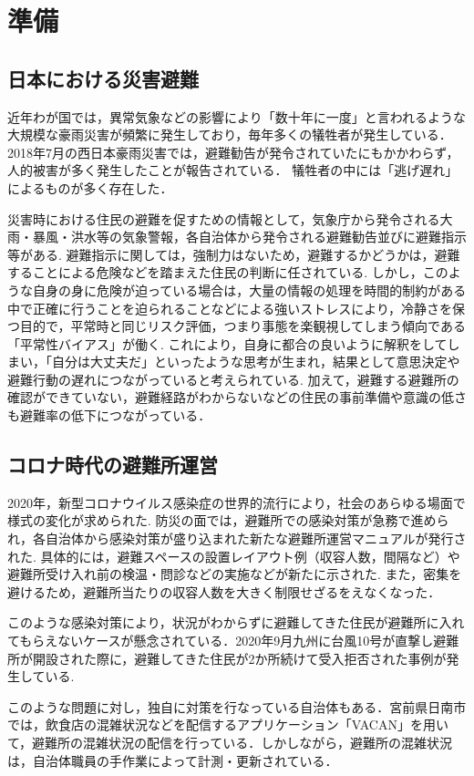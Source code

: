 \documentclass[technicalreport,dvipdfmx]{ieicej}
\begin{document}
\section{準備}
\subsection{日本における災害避難} 
近年わが国では，異常気象などの影響により「数十年に一度」と言われるような大規模な豪雨災害が頻繁に発生しており，毎年多くの犠牲者が発生している． 2018年7月の西日本豪雨災害では，避難勧告が発令されていたにもかかわらず，人的被害が多く発生したことが報告されている．\cite{1} 犠牲者の中には「逃げ遅れ」によるものが多く存在した．

災害時における住民の避難を促すための情報として，気象庁から発令される大雨・暴風・洪水等の気象警報，各自治体から発令される避難勧告並びに避難指示等がある. 避難指示に関しては，強制力はないため，避難するかどうかは，避難することによる危険などを踏まえた住民の判断に任されている. しかし，このような自身の身に危険が迫っている場合は，大量の情報の処理を時間的制約がある中で正確に行うことを迫られることなどによる強いストレスにより，冷静さを保つ目的で，平常時と同じリスク評価，つまり事態を楽観視してしまう傾向である「平常性バイアス」が働く. これにより，自身に都合の良いように解釈をしてしまい，「自分は大丈夫だ」といったような思考が生まれ，結果として意思決定や避難行動の遅れにつながっていると考えられている. \cite{2} 加えて，避難する避難所の確認ができていない，避難経路がわからないなどの住民の事前準備や意識の低さも避難率の低下につながっている．

\subsection{コロナ時代の避難所運営}
2020年，新型コロナウイルス感染症の世界的流行により，社会のあらゆる場面で様式の変化が求められた. 防災の面では，避難所での感染対策が急務で進められ，各自治体から感染対策が盛り込まれた新たな避難所運営マニュアルが発行された. 具体的には，避難スペースの設置レイアウト例（収容人数，間隔など）や避難所受け入れ前の検温・問診などの実施などが新たに示された. また，密集を避けるため，避難所当たりの収容人数を大きく制限せざるをえなくなった．

このような感染対策により，状況がわからずに避難してきた住民が避難所に入れてもらえないケースが懸念されている．2020年9月九州に台風10号が直撃し避難所が開設された際に，避難してきた住民が2か所続けて受入拒否された事例が発生している\cite{7}. 

このような問題に対し，独自に対策を行なっている自治体もある．宮前県日南市では，飲食店の混雑状況などを配信するアプリケーション「VACAN」を用いて，避難所の混雑状況の配信を行っている．しかしながら，避難所の混雑状況は，自治体職員の手作業によって計測・更新されている．
\end{document}
